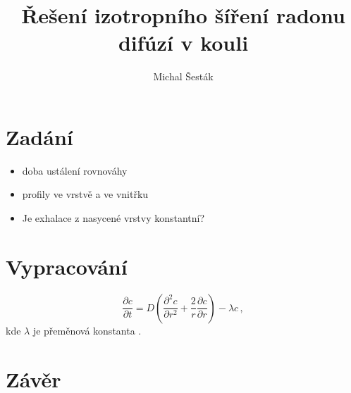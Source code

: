 \documentclass[11pt,a4paper]{article}
\author{Michal Šesták}
\title{Řešení izotropního šíření radonu difúzí v kouli}
\begin{document}
	\maketitle
	\section{Zadání}
	\begin{itemize}
		\item doba ustálení rovnováhy
		\item profily ve vrstvě a ve vnitřku
		\item Je exhalace z nasycené vrstvy konstantní?
	\end{itemize}
	\section{Vypracování}
	\begin{equation}
	\frac{\partial c}{\partial t}=D\left( \frac{\partial^2 c}{\partial r^2}+\frac{2}{r}\frac{\partial c}{\partial r}\right)-\lambda c \,,
	\end{equation}
	kde $\lambda$ je přeměnová konstanta .
	\section{Závěr}
\end{document}
